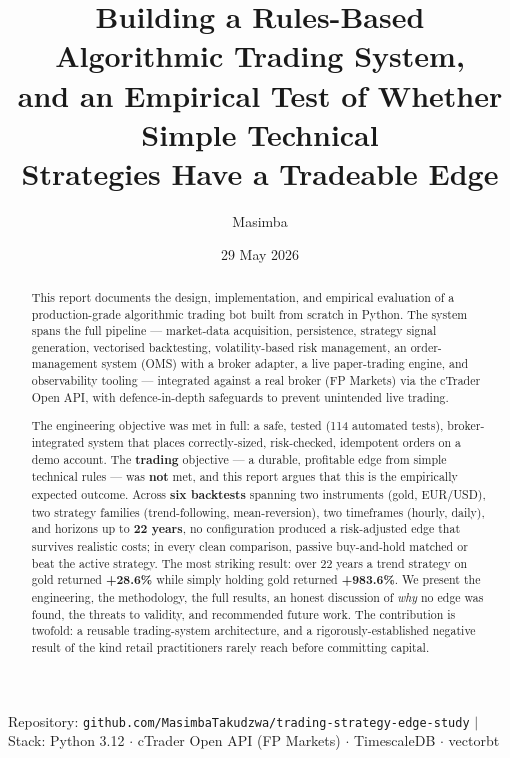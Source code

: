 \documentclass[11pt,a4paper]{article}
\title{\textbf{Building a Rules-Based Algorithmic Trading System,\\ and an Empirical Test of Whether Simple Technical\\ Strategies Have a Tradeable Edge}}
\author{Masimba}
\date{29 May 2026}
\begin{document}
\maketitle

\begin{center}
\small
Repository: \texttt{github.com/MasimbaTakudzwa/trading-strategy-edge-study} \quad$\vert$\quad
Stack: Python 3.12 $\cdot$ cTrader Open API (FP Markets) $\cdot$ TimescaleDB $\cdot$ vectorbt
\end{center}

\begin{abstract}
\noindent This report documents the design, implementation, and empirical evaluation of a production-grade algorithmic trading bot built from scratch in Python. The system spans the full pipeline --- market-data acquisition, persistence, strategy signal generation, vectorised backtesting, volatility-based risk management, an order-management system (OMS) with a broker adapter, a live paper-trading engine, and observability tooling --- integrated against a real broker (FP Markets) via the cTrader Open API, with defence-in-depth safeguards to prevent unintended live trading.

The engineering objective was met in full: a safe, tested (114 automated tests), broker-integrated system that places correctly-sized, risk-checked, idempotent orders on a demo account. The \textbf{trading} objective --- a durable, profitable edge from simple technical rules --- was \textbf{not} met, and this report argues that this is the empirically expected outcome. Across \textbf{six backtests} spanning two instruments (gold, EUR/USD), two strategy families (trend-following, mean-reversion), two timeframes (hourly, daily), and horizons up to \textbf{22 years}, no configuration produced a risk-adjusted edge that survives realistic costs; in every clean comparison, passive buy-and-hold matched or beat the active strategy. The most striking result: over 22 years a trend strategy on gold returned \textbf{+28.6\%} while simply holding gold returned \textbf{+983.6\%}. We present the engineering, the methodology, the full results, an honest discussion of \emph{why} no edge was found, the threats to validity, and recommended future work. The contribution is twofold: a reusable trading-system architecture, and a rigorously-established negative result of the kind retail practitioners rarely reach before committing capital.
\end{abstract}

\tableofcontents
\newpage
\end{document}

